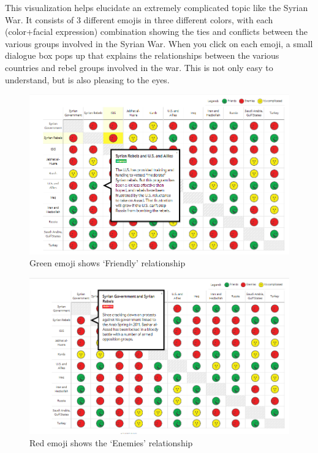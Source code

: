 \documentclass[]{book}
\theoremstyle{definition}
\theoremstyle{definition}
\theoremstyle{definition}
\theoremstyle{remark}
\begin{document}
This visualization helps elucidate an extremely complicated topic like
the Syrian War. It consists of 3 different emojis in three different
colors, with each (color+facial expression) combination showing the ties
and conflicts between the various groups involved in the Syrian War.
When you click on each emoji, a small dialogue box pops up that explains
the relationships between the various countries and rebel groups
involved in the war. This is not only easy to understand, but is also
pleasing to the eyes.

\begin{figure}
\centering
\includegraphics{images/img_syria_friendly.PNG}
\caption{Green emoji shows `Friendly' relationship}
\end{figure}

\begin{figure}
\centering
\includegraphics{images/img_syria_enemies.PNG}
\caption{Red emoji shows the `Enemies' relationship}
\end{figure}
\end{document}
